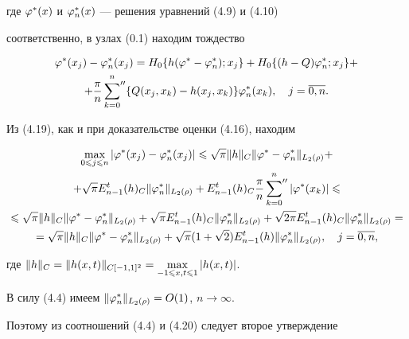 где $\varphi^*(x)$ и $\varphi_n^*(x)$ --- решения уравнений (4.9) и (4.10) 


соответственно, в узлах (0.1) находим тождество


\begin{multline}


\vp^*(x_j) - \vp_n^*(x_j)=H_0\{h(\vp^* - \vp_n^*);x_j\}+


H_0\{(h-Q)\vp_n^*;x_j\}+ \\ +


\frac{\pi}{n}\sideset{}{''}\sum_{k=0}^n


\{Q(x_j,x_k) - h(x_j,x_k)\}\vp_n^*(x_k),


\quad j=\overline{0,n}.


\end{multline}


Из (4.19), как и при доказательстве оценки (4.16), находим


\begin{multline}


\max_{0\lea j\lea n}|\vp^*(x_j) - \vp_n^*(x_j)|\lea


\sqrt{\pi}\|h\|_C\|\vp^* - \vp_n^*\|_{L_2(\rho)}+ \\


%


+\sqrt{\pi}E_{n-1}^t(h)_C\|\vp_n^*\|_{L_2(\rho)}+E_{n-1}^t(h)_C\frac{\pi}{n}


\sideset{}{''}\sum_{k=0}^n |\vp^*(x_k)|\lea \\


%


\lea \sqrt{\pi}\|h\|_C\|\vp^*-\vp_n^*\|_{L_2(\rho)}+


\sqrt{\pi}E_{n-1}^t(h)_C\|\vp_n^*\|_{L_2(\rho)}+


\sqrt{2\pi}E_{n-1}^t(h)_C\|\vp_n^*\|_{L_2(\rho)}= \\


%


=\sqrt{\pi}\|h\|_C \|\vp^* - \vp_n^*\|_{L_2(\rho)}+


\sqrt{\pi}(1+\sqrt{2})E_{n-1}^t(h)\|\vp_n^*\|_{L_2(\rho)},\quad j=\overline{0,n},


\end{multline}


где $\|h\|_C=\|h(x,t)\|_{C[-1,1]^2}=\max\limits_{-1\leqslant x,t\leqslant 1}|h(x,t)|$.





В силу (4.4) имеем $\|\varphi_n^*\|_{L_2(\rho)}=O(1)$, $n\to \infty$.


Поэтому из соотношений (4.4) и (4.20) следует второе утверждение 


